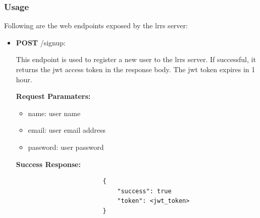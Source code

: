 \documentclass{article}
\begin{document}
        \subsubsection{Usage}
        Following are the web endpoints exposed by the \gls{lrrs} server:
        \begin{itemize}
            \item \textbf{POST} /signup:
                \begin{addmargin}[1em]{2em}%
                    This endpoint is used to register a new user to the \gls{lrrs} server. If successful, it returns the jwt access token in the response body. The jwt token expires in 1 hour.
                    \par\textbf{Request Paramaters:}
                    \begin{itemize}
                        \item name: user name
                        \item email: user email address
                        \item password: user password
                    \end{itemize}
                    \par\textbf{Success Response:}
                    \begin{listing}[H]
                    \begin{verbatim}
                        {     
                            "success": true
                            "token": <jwt_token>
                        }
                    \end{verbatim}
                    \end{listing}
                \end{addmargin}
                

\end{itemize}
\end{document}
